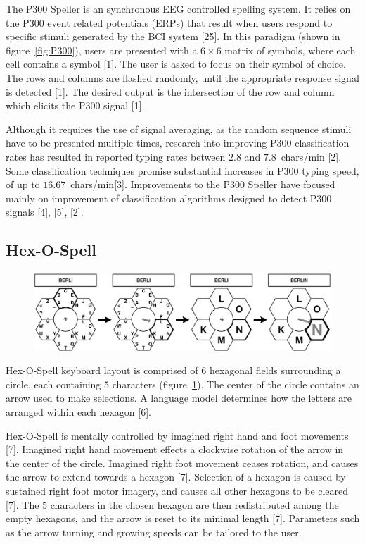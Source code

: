 \documentclass[12pt,titlepage]{article}
\begin{document}
The P300 Speller is an synchronous EEG controlled spelling system.   It relies on the P300 event 
related potentials (ERPs) that result when users respond to specific stimuli generated by the BCI 
system [25].  In this paradigm (shown in figure~\ref{fig:P300}), users are presented with a $6\times6$ matrix of symbols, where 
each cell contains a symbol [1].  The user is asked to focus on their symbol of choice.  The rows and 
columns are flashed randomly, until the appropriate response signal is detected [1].  The desired output
is the intersection of the row and column which elicits the P300 signal [1].

Although it requires the use of signal averaging, as the random sequence stimuli have to be presented 
multiple times, research into improving P300 classification rates has resulted in reported typing rates 
between $2.8$ and $7.8$~chars/min [2].  Some classification techniques promise substantial increases in 
P300 typing speed, of up to $16.67$~chars/min[3].  Improvements to the P300 Speller have focused mainly 
on improvement of classification algorithms designed to detect P300 signals [4], [5], [2].

\subsection{Hex-O-Spell}

\begin{figure}[t]
\begin{center}
	\includegraphics[scale=0.10]{figure3.jpeg}
	\label{fig:Hex}
\end{center}
\end{figure}

Hex-O-Spell keyboard layout is comprised of $6$ hexagonal fields surrounding a circle, each containing 
$5$ characters (figure~\ref{fig:Hex}).  The center of the circle contains an arrow used to make selections.  A language 
model determines how the letters are arranged within each hexagon [6].

Hex-O-Spell is mentally controlled by imagined right hand and foot movements [7].  Imagined right 
hand movement effects a clockwise rotation of the arrow in the center of the circle.  Imagined right foot 
movement ceases rotation, and causes the arrow to extend towards a hexagon [7].  Selection of a 
hexagon is caused by sustained right foot motor imagery, and causes all other hexagons to be 
cleared [7].  The 5 characters in the chosen hexagon are then redistributed among the empty hexagons, 
and the arrow is reset to its minimal length [7].  Parameters such as the arrow turning and growing 
speeds can be tailored to the user.
\end{document}

